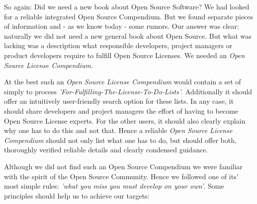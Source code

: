 %
%
%
%
%



So again: Did we need a new book about Open Source Software? We had looked for a
reliable integrated Open Source Compendium. But we found separate pieces of
information and - as we know today - some rumors. Our answer was clear:
naturally we did not need a new general book about Open Source. But what was
lacking was a description what responsible developers, project managers or
product developers require to fulfill Open Source Licenses. We needed an
\textit{Open Source License Compendium}.

At the best such an \textit{Open Source License Compendium} would contain a set
of simply to process \textit{'For-Fulfilling-The-License-To-Do-Lists'}.
Additionally it should offer an intuitively user-friendly search option for
these lists. In any case, it should share developers and project managers the
effort of having to become Open Source License experts. For the other users, it
should also clearly explain why one has to do this and not that. Hence a
reliable \textit{Open Source License Compendium} should not only list what one
has to do, but should offer both, thoroughly verified reliable details and
clearly condensed guidance.

Although we did not find such an Open Source Compendium we were familiar with
the spirit of the Open Source Community. Hence we followed one of its' most
simple rules: \emph{'what you miss you must develop on your own'}. Some
principles should help us to achieve our targets:

